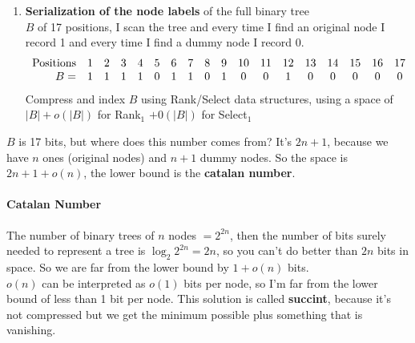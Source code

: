 \documentclass[10pt]{report}
\begin{document}
\begin{enumerate}
\begin{center}
	\end{center}
	\item \textbf{Serialization of the node labels} of the full binary tree\\
	$B$ of 17 positions, I scan the tree and every time I find an original node I record 1 and every time I find a dummy node I record 0.
	$$\begin{array}{r c c c c c c c c c c c c c c c c c}
	\hbox{Positions}&1&2&3&4&5&6&7&8&9&10&11&12&13&14&15&16&17\\
	B = &1&1&1&1&0&1&1&0&1&0&0&1&0&0&0&0&0
	\end{array}$$
	Compress and index $B$ using Rank/Select data structures, using a space of $|B|+o(|B|)$ for Rank$_1$ $+0(|B|)$ for Select$_1$
\end{enumerate}
$B$ is 17 bits, but where does this number comes from? It's $2n+1$, because we have $n$ ones (original nodes) and $n+1$ dummy nodes. So the space is $2n+1+o(n)$, the lower bound is the \textbf{catalan number}.
\paragraph{Catalan Number} The number of binary trees of $n$ nodes $= 2^{2n}$, then the number of bits surely needed to represent a tree is $\log_2 2^{2n} = 2n$, so you can't do better than $2n$ bits in space. So we are far from the lower bound by $1+o(n)$ bits.\\
$o(n)$ can be interpreted as $o(1)$ bits per node, so I'm far from the lower bound of less than 1 bit per node. This solution is called \textbf{succint}, because it's not compressed but we get the minimum possible plus something that is vanishing.\\\\
\end{document}
